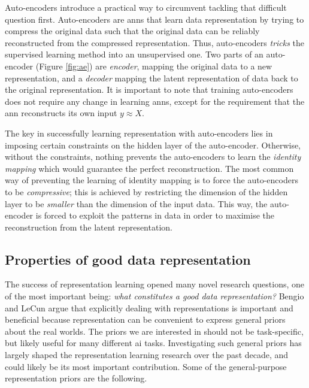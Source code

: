 Auto-encoders introduce a practical way to circumvent tackling that difficult question first.
Auto-encoders are \gls{ann}s that learn data representation by trying to compress the original data such that the original data can be reliably reconstructed from the compressed representation.
Thus, auto-encoders \textit{tricks} the supervised learning method into an unsupervised one.
Two parts of an auto-encoder (Figure \ref{fig:ae}) are \textit{encoder}, mapping the original data to a new representation, and a \textit{decoder} mapping the latent representation of data back to the original representation.
It is important to note that training auto-encoders does not require any change in learning \gls{ann}s, except for the requirement that the \gls{ann} reconstructs its own input $y \approx X$.




The key in successfully learning representation with auto-encoders lies in imposing certain constraints on the hidden layer of the auto-encoder.
Otherwise, without the constraints, nothing prevents the auto-encoders to learn the \textit{identity mapping} which would guarantee the perfect reconstruction.
The most common way of preventing the learning of identity mapping is to force the auto-encoders to be \textit{compressive}; this is achieved by restricting the dimension of the hidden layer to be \textit{smaller} than the dimension of the input data.
This way, the auto-encoder is forced to exploit the patterns in data in order to maximise the reconstruction from the latent representation.







\subsection{Properties of good data representation}
\label{ch3:sec:properties}


The success of representation learning opened many novel research questions, one of the most important being: \textit{what constitutes a good data representation?}
Bengio and LeCun \cite{Bengio2013RLR} argue that explicitly dealing with representations is important and beneficial because representation can be convenient to express general priors about the real worlds.
The priors we are interested in should not be task-specific, but likely useful for many different \gls{ai} tasks.
Investigating such general priors has largely shaped the representation learning research over the past decade, and could likely be its most important contribution.
Some of the general-purpose representation priors are the following.



